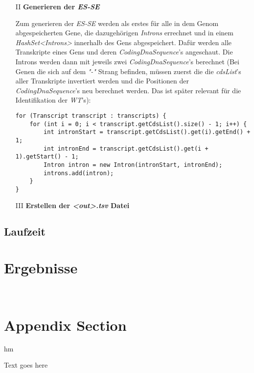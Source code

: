 \documentclass[12pt]{article}
\begin{document}
\begin{enumerate}
    \item[II] \textbf{Generieren der \textit{ES-SE}}

        Zum generieren der \textit{ES-SE} werden als erstes für alle in dem Genom abgespeicherten
        Gene, die dazugehörigen \textit{Introns} errechnet und in einem \textit{HashSet<Introns>} 
        innerhalb des Gens abgespeichert. Dafür werden alle Transkripte eines Gens und deren
        \textit{CodingDnaSequence}'s angeschaut. Die Introns werden dann mit jeweils
        zwei \textit{CodingDnaSequence}'s berechnet
        (Bei Genen die sich auf dem \textit{"-"} Strang befinden, müssen zuerst die 
        die \textit{cdsList}'s aller Transkripte invertiert werden und die 
        Positionen der \textit{CodingDnaSequence}'s neu berechnet werden.
        Das ist später relevant für die Identifikation der \textit{WT}'s):
    \begin{verbatim}
for (Transcript transcript : transcripts) {
    for (int i = 0; i < transcript.getCdsList().size() - 1; i++) {
        int intronStart = transcript.getCdsList().get(i).getEnd() + 1;
        int intronEnd = transcript.getCdsList().get(i + 1).getStart() - 1;
        Intron intron = new Intron(intronStart, intronEnd);
        introns.add(intron);
    }
}
    \end{verbatim}
    

    \item[III] \textbf{Erstellen der \textit{<out>.tsv} Datei}
\end{enumerate}
\subsection{Laufzeit}
\section{Ergebnisse}










\newpage~\appendix

\section{Appendix Section}

hm 

Text goes here
\end{document}
